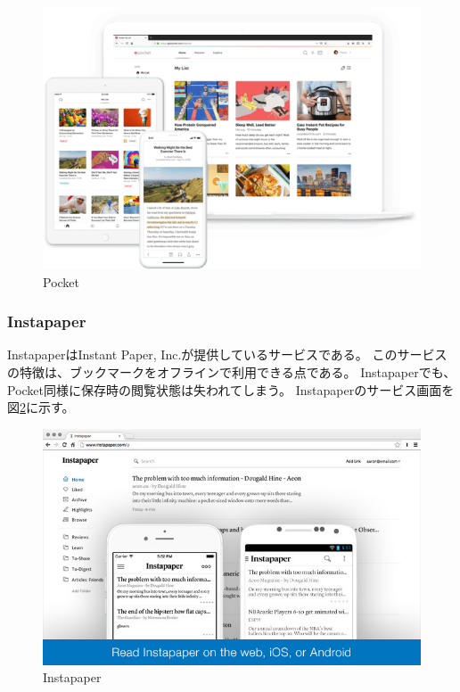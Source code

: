 \begin{figure}[htbp]
  \caption{Pocket}
  \label{fig:pocket}
  \begin{center}
    \includegraphics[bb=0 0 545 378,width=15cm]{img/020_related_works/pocket.pdf}
  \end{center}
\end{figure}

\subsubsection{Instapaper}
InstapaperはInstant Paper, Inc.\cite{instant-paper-inc}が提供しているサービスである。
このサービスの特徴は、ブックマークをオフラインで利用できる点である。
Instapaperでも、Pocket同様に保存時の閲覧状態は失われてしまう。
Instapaperのサービス画面を図\ref{fig:instapaper}に示す。

\begin{figure}[htbp]
  \caption{Instapaper}
  \label{fig:instapaper}
  \begin{center}
    \includegraphics[bb=0 0 640 400,width=15cm]{img/020_related_works/instapaper.pdf}
  \end{center}
\end{figure}

